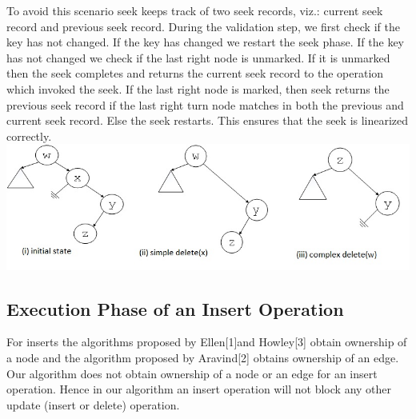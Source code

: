 \documentclass[11pt]{article}
\begin{document}
\begin{multicols}{2}
To avoid this scenario seek keeps track of two seek records, viz.: current seek record and previous seek record. During the validation step, we first check if the key has not changed. If the key has changed we restart the seek phase. If the key has not changed we check if the last right node is unmarked. If it is unmarked then the seek completes and returns the current seek record to the operation which invoked the seek. If the last right node is marked, then seek returns the previous seek record if the last right turn node matches in both the previous and current seek record. Else the seek restarts. This ensures that the seek is linearized correctly.
\includegraphics[width=1.0\linewidth]{seek.jpg}

\subsection{Execution Phase of an Insert Operation}
For inserts the algorithms proposed by Ellen[1]and Howley[3] obtain ownership of a node and the algorithm proposed by Aravind[2] obtains ownership of an edge. Our algorithm does not obtain ownership of a node or an edge for an insert operation. Hence in our algorithm an insert operation will not block any other update (insert or delete) operation.\par


\end{multicols}
\end{document}
